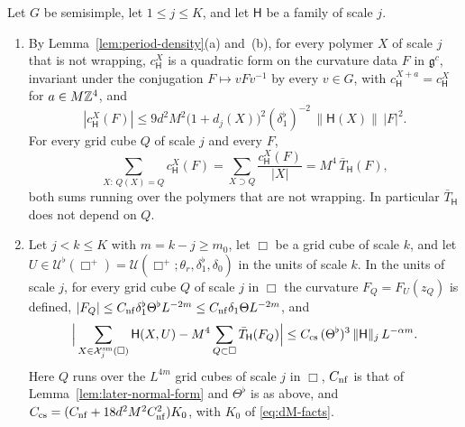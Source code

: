 \begin{lemma}\label{lem:cell-sums}
Let $G$ be semisimple, let $1\le j\le K$, and let $\mathsf H$ be a family of scale $j$.
\begin{enumerate}[label=(\alph*)]
\item By Lemma~\ref{lem:period-density}(a) and~(b), for every polymer $X$ of scale $j$ that is not wrapping, $c^X_{\mathsf H}$ is a quadratic form on the curvature data $F$ in $\mathfrak g^c$, invariant under the conjugation $F\mapsto vFv^{-1}$ by every $v\in G$, with $c^{X+a}_{\mathsf H}=c^X_{\mathsf H}$ for $a\in M\mathbb Z^4$, and
\begin{equation}\label{eq:cX-bound}
|c^X_{\mathsf H}(F)|\le9d^2M^2\big(1+d_j(X)\big)^2(\delta_1^\flat)^{-2}\,\|\mathsf H(X)\|\,|F|^2 .
\end{equation}
For every grid cube $Q$ of scale $j$ and every $F$,
\begin{equation}\label{eq:cell-identity}
\sum_{X:\,Q(X)=Q}c^X_{\mathsf H}(F)=\sum_{X\supset Q}\frac{c^X_{\mathsf H}(F)}{|X|}=M^4\,\bar T_{\mathsf H}(F),
\end{equation}
both sums running over the polymers that are not wrapping. In particular $\bar T_{\mathsf H}$ does not depend on $Q$.
\item Let $j<k\le K$ with $m=k-j\ge m_0$, let $\Box$ be a grid cube of scale $k$, and let $U\in\mathcal U^\flat(\Box^+)=\mathcal U(\Box^+;\theta_r,\delta_1^\flat,\delta_0)$ in the units of scale $k$. In the units of scale $j$, for every grid cube $Q$ of scale $j$ in $\Box$ the curvature $F_Q=F_U(z_Q)$ is defined, $|F_Q|\le C_{\rm nf}\delta_1^\flat\Theta^\flat L^{-2m}\le C_{\rm nf}\delta_1\Theta L^{-2m}$, and
\begin{equation}\label{eq:cell-sums}
\Big|\sum_{X\in\mathcal X^{\rm sm}_j(\Box)}\mathsf H(X,U)-M^4\sum_{Q\subset\Box}\bar T_{\mathsf H}(F_Q)\Big|\le C_{\rm cs}\,(\Theta^\flat)^3\,\|\mathsf H\|_j\,L^{-\alpha m}.
\end{equation}
Here $Q$ runs over the $L^{4m}$ grid cubes of scale $j$ in $\Box$, $C_{\rm nf}$ is that of Lemma~\ref{lem:later-normal-form} and $\Theta^\flat$ is as above, and $C_{\rm cs}=(C_{\rm nf}+18d^2M^2C_{\rm nf}^2)K_0$, with $K_0$ of \eqref{eq:dM-facts}.
\end{enumerate}
\end{lemma}

